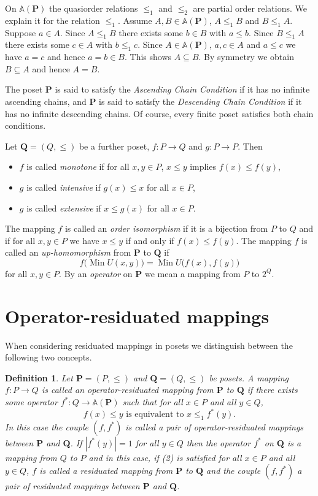 \documentclass[12pt]{article}
\DeclareMathOperator{\Min}{Min}
\newtheorem{definition}[theorem]{Definition}
\begin{document}
On $\mathbb A(\mathbf P)$ the quasiorder relations $\le_1$ and $\le_2$ are partial order relations. We explain it for the relation $\le_1$. Assume $A,B\in\mathbb A(\mathbf P)$, $A\le_1B$ and $B\le_1A$. Suppose $a\in A$. Since $A\le_1B$ there exists some $b\in B$ with $a\le b$. Since $B\le_1A$ there exists some $c\in A$ with $b\le_1c$. Since $A\in\mathbb A(\mathbf P)$, $a,c\in A$ and $a\le c$ we have $a=c$ and hence $a=b\in B$. This shows $A\subseteq B$. By symmetry we obtain $B\subseteq A$ and hence $A=B$.

The poset $\mathbf P$ is said to satisfy the {\em Ascending Chain Condition} if it has no infinite ascending chains, and $\mathbf P$ is said to satisfy the {\em Descending Chain Condition} if it has no infinite descending chains. Of course, every finite poset satisfies both chain conditions.

Let $\mathbf Q=(Q,\le)$ be a further poset, $f\colon P\to Q$ and $g\colon P\to P$. Then
\begin{itemize}
\item $f$ is called {\em monotone} if for all $x,y\in P$, $x\le y$ implies $f(x)\le f(y)$,
\item $g$ is called {\em intensive} if $g(x)\le x$ for all $x\in P$,
\item $g$ is called {\em extensive} if $x\le g(x)$ for all $x\in P$.
\end{itemize}
The mapping $f$ is called an {\em order isomorphism} if it is a bijection from $P$ to $Q$ and if for all $x,y\in P$ we have $x\le y$ if and only if $f(x)\le f(y)$. The mapping $f$ is called an {\em up-homomorphism} from $\mathbf P$ to $\mathbf Q$ if
\[
f\big(\Min U(x,y)\big)=\Min U\big(f(x),f(y)\big)\tag{1}
\]
for all $x,y\in P$. By an {\em operator} on $\mathbf P$ we mean a mapping from $P$ to $2^Q$.

\section{Operator-residuated mappings}

When considering residuated mappings in posets we distinguish between the following two concepts.

\begin{definition}
Let $\mathbf P=(P,\le)$ and $\mathbf Q=(Q,\le)$ be posets. A mapping $f\colon P\to Q$ is called an {\em operator-residuated} mapping from $\mathbf P$ to $\mathbf Q$ if there exists some operator $f^*\colon Q\to\mathbb A(\mathbf P)$ such that for all $x\in P$ and all $y\in Q$, 
\[
f(x)\le y\text{ is equivalent to }x\le_1f^*(y).\tag{2}
\]
In this case the couple $(f,f^*)$ is called a {\em pair of operator-residuated mappings} between $\mathbf P$ and $\mathbf Q$. If $|f^*(y)|=1$ for all $y\in Q$ then the operator $f^*$ on $\mathbf Q$ is a mapping from $Q$ to $P$ and in this case, if {\rm(2)} is satisfied for all $x\in P$ and all $y\in Q$, $f$ is called a {\em residuated mapping} from $\mathbf P$ to $\mathbf Q$ and the couple $(f,f^*)$ a {\em pair of residuated mappings} between $\mathbf P$ and $\mathbf Q$.
\end{definition}
\end{document}
